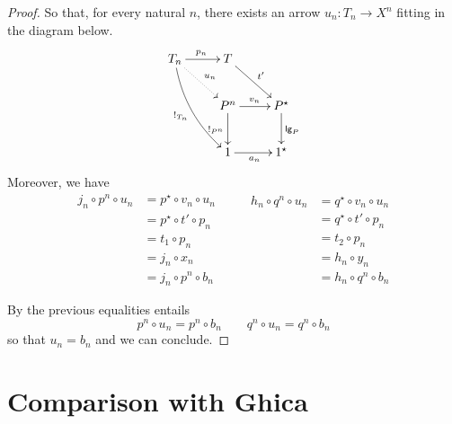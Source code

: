 \documentclass[runningheads,envcountsect]{llncs}
\newcommand{\lgh}{\mathsf{lg}}
\begin{document}
\begin{proof}
So that, for every natural $n$, there exists an arrow $u_n\colon T_n \to X^n$ fitting in the diagram below.
\[\xymatrix{T_n  \ar@/_.3cm/[ddr]_{!_{T_n}}\ar@{.>}[dr]^{u_n} \ar[r]^{p_n} & T \ar[dr]^{t'}\\ &P^n   \ar[d]_{!_{P^n}}\ar[r]^{v_n}& P^\star \ar[d]^{\lgh_P}\\ & 1 \ar[r]_{a_n}& 1^\star }\]
Moreover, we have
\[\begin{split}
j_n\circ	p^n\circ u_n&=p^\star \circ  v_n\circ u_n\\&=p^\star \circ t'\circ p_n\\&=t_1\circ p_n\\&=j_n\circ x_n\\&=j_n\circ p^n\circ b_n
\end{split}\qquad \begin{split}
h_n\circ	q^n\circ u_n&=q^\star \circ  v_n\circ u_n\\&=q^\star \circ t'\circ p_n\\&=t_2\circ p_n\\&=h_n\circ y_n\\&=h_n\circ q^n\circ b_n
\end{split}\]

By  the previous equalities entails
\[p^n\circ u_n=p^n\circ b_n \qquad q^n\circ u_n=q^n\circ b_n\]
so that $u_n=b_n$ and we can conclude.
\end{proof}


\section{Comparison with Ghica}
\end{document}
